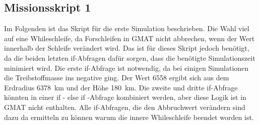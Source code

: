
\subsection{Missionsskript 1}


Im Folgenden ist das Skript für die erste Simulation beschrieben. Die Wahl viel auf eine Whileschleife, da Forschleifen in GMAT nicht abbrechen, wenn der Wert innerhalb der Schleife verändert wird.
Das ist für dieses Skript jedoch benötigt, da die beiden letzten if-Abfragen dafür sorgen, dass die benötigte Simulationszeit minimiert wird.
Die erste if-Abfrage ist notwendig, da bei einigen Simulationen die Treibstoffmasse ins negative ging. Der Wert \num{6558} ergibt sich aus dem Erdradius \SI{6378}{\km} und der Höhe \SI{180}{\km}. Die zweite und dritte if-Abfrage könnten in einer if - else if -Abfrage kombiniert werden, aber diese Logik ist in GMAT nicht enthalten.
Alle if-Abfragen, die den Abbruchwert verändern sind dazu da ermitteln zu können warum die innere Whileschleife beendet worden ist.\\


